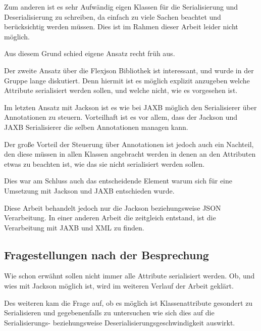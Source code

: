 Zum anderen ist es sehr Aufw\"andig eigen Klassen f\"ur die Serialisierung und Deserialisierung zu schreiben, da einfach zu viele Sachen beachtet und ber\"ucksichtig werden m\"ussen. Dies ist im Rahmen dieser Arbeit leider nicht m\"oglich.

Aus diesem Grund schied eigene Ansatz recht fr\"uh aus.

Der zweite Ansatz \"uber die Flexjson Bibliothek ist interessant, und wurde in der Gruppe lange diskutiert. Denn hiermit ist es m\"oglich explizit anzugeben welche Attribute serialisiert werden sollen, und welche nicht, wie es vorgesehen ist.

Im letzten Ansatz mit Jackson ist es wie bei \ac{JAXB} m\"oglich den Serialisierer \"uber Annotationen zu steuern. Vorteilhaft ist es vor allem, dass der Jackson und \ac{JAXB} Serialisierer die selben Annotationen managen kann. 

Der gro\ss{}e Vorteil der Steuerung \"uber Annotationen ist jedoch auch ein Nachteil, den diese m\"ussen in allen Klassen angebracht werden in denen an den Attributen etwas zu beachten ist, wie das sie nicht serialisiert werden sollen.

Dies war am Schluss auch das entscheidende Element warum sich f\"ur eine Umsetzung mit Jackson und \ac{JAXB} entschieden wurde. 

Diese Arbeit behandelt jedoch nur die Jackson beziehungsweise \ac{JSON} Verarbeitung. In einer anderen Arbeit die zeitgleich entstand, ist die Verarbeitung mit \ac{JAXB} und XML zu finden. \cite{Wal14} 

\subsection{Fragestellungen nach der Besprechung}
Wie schon erw\"ahnt sollen nicht immer alle Attribute serialisiert werden. Ob, und wies mit Jackson m\"oglich ist, wird im weiteren Verlauf der Arbeit gekl\"art. 

Des weiteren kam die Frage auf, ob es m\"oglich ist Klassenattribute gesondert zu Serialisieren und gegebenenfalls zu untersuchen wie sich dies auf die Serialisierungs- beziehungsweise Deserialisierungsgeschwindigkeit auswirkt.